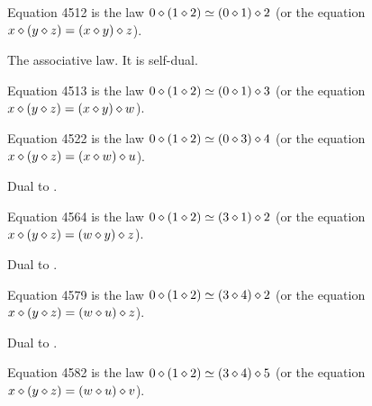 \begin{definition}[Equation 4512]\label{eq4512}\leanok{}  Equation 4512 is the law $0 \diamond (1 \diamond 2)  \simeq  (0 \diamond 1) \diamond 2$ (or the equation $x \diamond (y \diamond z) = (x \diamond y) \diamond z$).
\end{definition}

The associative law. It is self-dual.

\begin{definition}[Equation 4513]\label{eq4513}\leanok{}  Equation 4513 is the law $0 \diamond (1 \diamond 2)  \simeq  (0 \diamond 1) \diamond 3$ (or the equation $x \diamond (y \diamond z) = (x \diamond y) \diamond w$).
\end{definition}

\begin{definition}[Equation 4522]\label{eq4522}\leanok{}  Equation 4522 is the law $0 \diamond (1 \diamond 2)  \simeq  (0 \diamond 3) \diamond 4$ (or the equation $x \diamond (y \diamond z) = (x \diamond w) \diamond u$).
\end{definition}

Dual to .

\begin{definition}[Equation 4564]\label{eq4564}\leanok{}  Equation 4564 is the law $0 \diamond (1 \diamond 2)  \simeq  (3 \diamond 1) \diamond 2$ (or the equation $x \diamond (y \diamond z) = (w \diamond y) \diamond z$).
\end{definition}

Dual to .

\begin{definition}[Equation 4579]\label{eq4579}\leanok{}  Equation 4579 is the law $0 \diamond (1 \diamond 2)  \simeq  (3 \diamond 4) \diamond 2$ (or the equation $x \diamond (y \diamond z) = (w \diamond u) \diamond z$).
\end{definition}

Dual to .

\begin{definition}[Equation 4582]\label{eq4582}\leanok{}  Equation 4582 is the law $0 \diamond (1 \diamond 2)  \simeq  (3 \diamond 4) \diamond 5$ (or the equation $x \diamond (y \diamond z) = (w \diamond u) \diamond v$).
\end{definition}


